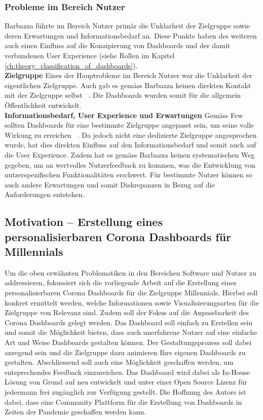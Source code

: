 \subsubsection{Probleme im Bereich Nutzer}
Barbazza führte im Bereich Nutzer primär die Unklarheit der Zielgruppe sowie deren Erwartungen und Informationsbedarf an. Diese Punkte haben des weiteren auch einen Einfluss auf die Konzipierung von Dashboards und der damit verbundenen User Experience (siehe Rollen im Kapitel \ref{ch:theory_classification_of_dashboards}).\\

\noindent
\textbf{Zielgruppe}
\newline
\indent
Eines der Hauptrobleme im Bereich Nutzer war die Unklarheit der eigentlichen Zielgruppe. Auch gab es gemäss Barbazza keinen direkten Kontakt mit der Zielgruppe selbst ~\citep[S. 8]{barbazza}. Die Dashboards wurden somit für die allgemein Öffentlichkeit entwickelt.\\

\noindent
\textbf{Informationsbedarf, User Experience und Erwartungen}
\newline
\indent
Gemäss Few sollten Dashboards für eine bestimmte Zielgruppe angepasst sein, um seine volle Wirkung zu erreichen ~\citep[S. 34]{information_dashboard_design}. Da jedoch nicht eine dedizierte Zielgruppe angesprochen wurde, hat dies direkten Einfluss auf den Informationsbedarf und somit auch auf die User Experience. Zudem hat es gemäss Barbazza keinen systematischen Weg gegeben, um an wertvolles Nutzerfeedback zu kommen, was die Entwicklung von nutzerspezifischen Funktionalitäten erschwert. Für bestimmte Nutzer können so auch andere Erwartungen und somit Diskrepanzen in Bezug auf die Anforderungen entstehen.

\clearpage
\subsection{Motivation – Erstellung eines personalisierbaren Corona Dashboards für Millennials}
Um die oben erwähnten Problematiken in den Bereichen Software und Nutzer zu addressieren, fokussiert sich die vorliegende Arbeit auf die Erstellung eines personalisierbaren Corona Dashboards für die Zielgruppe Millennials. Hierbei soll konkret ermittelt werden, welche Informationen sowie Visualisierungsarten für die Zielgruppe von Relevanz sind. Zudem soll der Fokus auf die Anpassbarkeit des Corona Dashboards gelegt werden. Das Dashboard soll einfach zu Erstellen sein und somit die Möglichkeit bieten, dass auch unerfahrene Nutzer auf eine einfache Art und Weise Dashboards gestalten können. Der Gestaltungsprozess soll dabei anregend sein und die Zielgruppe dazu animieren Ihre eigenen Dashboards zu gestalten. Abschliessend soll auch eine Möglichkeit geschaffen werden, um entsprechendes Feedback einzureichen. Das Dashboard wird dabei als In-House Lösung von Grund auf neu entwickelt und unter einer Open Source Lizenz für jedermann frei zugänglich zur Verfügung gestellt. Die Hoffnung des Autors ist dabei, dass eine Community Plattform für die Erstellung von Dashboards in Zeiten der Pandemie geschaffen werden kann.
